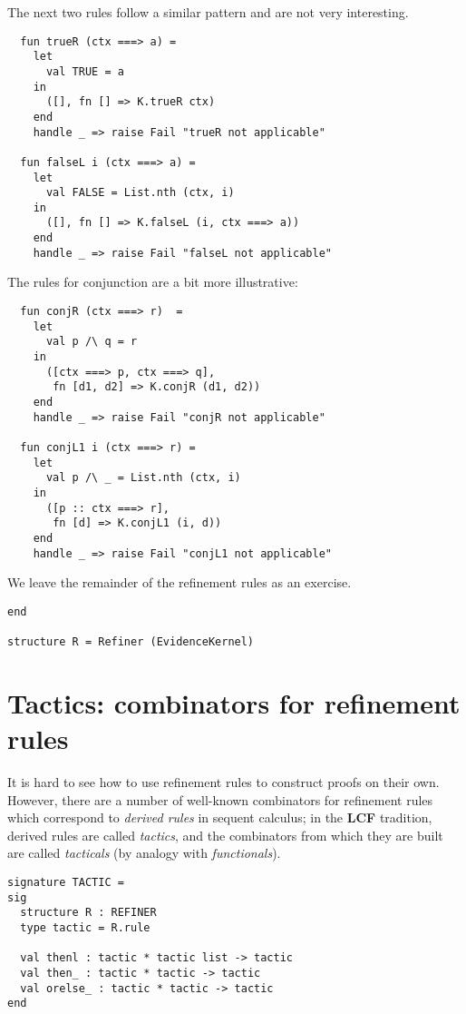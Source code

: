 \documentclass{article}
\newcommand\FormatLang[1]{{\bfseries\sffamily #1}}
\newcommand\LCF{\FormatLang{LCF}}
\theoremstyle{definition}
\theoremstyle{remark}
\begin{document}
The next two rules follow a similar pattern and are not very interesting.
\begin{verbatim}
  fun trueR (ctx ===> a) =
    let
      val TRUE = a
    in
      ([], fn [] => K.trueR ctx)
    end
    handle _ => raise Fail "trueR not applicable"

  fun falseL i (ctx ===> a) =
    let
      val FALSE = List.nth (ctx, i)
    in
      ([], fn [] => K.falseL (i, ctx ===> a))
    end
    handle _ => raise Fail "falseL not applicable"
\end{verbatim}
The rules for conjunction are a bit more illustrative:

\begin{verbatim}
  fun conjR (ctx ===> r)  =
    let
      val p /\ q = r
    in
      ([ctx ===> p, ctx ===> q],
       fn [d1, d2] => K.conjR (d1, d2))
    end
    handle _ => raise Fail "conjR not applicable"

  fun conjL1 i (ctx ===> r) =
    let
      val p /\ _ = List.nth (ctx, i)
    in
      ([p :: ctx ===> r],
       fn [d] => K.conjL1 (i, d))
    end
    handle _ => raise Fail "conjL1 not applicable"
\end{verbatim}

We leave the remainder of the refinement rules as an exercise.
\begin{verbatim}
end

structure R = Refiner (EvidenceKernel)
\end{verbatim}

\section{Tactics: combinators for refinement rules}

It is hard to see how to use refinement rules to construct proofs on
their own. However, there are a number of well-known combinators for
refinement rules which correspond to \emph{derived rules} in sequent
calculus; in the \LCF{} tradition, derived rules are called
\emph{tactics}, and the combinators from which they are built are
called \emph{tacticals} (by analogy with \emph{functionals}).


\begin{verbatim}
signature TACTIC =
sig
  structure R : REFINER
  type tactic = R.rule

  val thenl : tactic * tactic list -> tactic
  val then_ : tactic * tactic -> tactic
  val orelse_ : tactic * tactic -> tactic
end
\end{verbatim}
\end{document}
